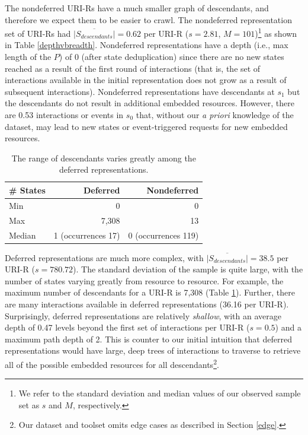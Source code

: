 \documentclass{sig-alternate}
\begin{document}
The nondeferred URI-Rs have a much smaller graph of descendants, and therefore we expect them to be easier to crawl. The nondeferred representation set of URI-Rs had $\overline{|S_{descendants}|}=0.62$ per URI-R ($s=2.81$, $M=101$)\footnote{We refer to the standard deviation and median values of our observed sample set as $s$ and $M$, respectively.} as shown in Table \ref{depthvbreadth}. Nondeferred representations have a depth (i.e., max length of the $P$) of 0 (after state deduplication) since there are no new states reached as a result of the first round of interactions (that is, the set of interactions available in the initial representation does not grow as a result of subsequent interactions). Nondeferred representations have descendants at $s_1$ but the descendants do not result in additional embedded resources. However, there are 0.53 interactions or events in $s_0$ that, without our \emph{a priori} knowledge of the dataset, may lead to new states or event-triggered requests for new embedded resources.

\begin{table}
\centering
\begin{tabular}{ l | r | r }
\textbf{\# States} & \textbf{Deferred} & \textbf{Nondeferred} \\
\hline
\hline
Min & 0 & 0\\
\hline
Max & 7,308 & 13\\
\hline
Median & 1 (occurrences 17) & 0 (occurrences 119)\\
\hline
\end{tabular}
  \caption{The range of descendants varies greatly among the deferred representations.}
  \label{stateminmedmod}
\end{table}


Deferred representations are much more complex, with $\overline{|S_{descendants}|}=38.5$ per URI-R ($s=780.72$). The standard deviation of the sample is quite large, with the number of states varying greatly from resource to resource. For example, the maximum number of descendants for a URI-R is 7,308 (Table \ref{stateminmedmod}). Further, there are many interactions available in deferred representations (36.16 per URI-R). Surprisingly, deferred representations are relatively \emph{shallow}, with an average depth of 0.47 levels beyond the first set of interactions per URI-R ($s=0.5$) and a maximum path depth of 2. This is counter to our initial intuition that deferred representations would have large, deep trees of interactions to traverse to retrieve all of the possible embedded resources for all descendants\footnote{Our dataset and toolset omits edge cases as described in Section \ref{edge}.}.
\end{document}
